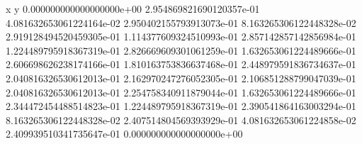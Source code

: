 x y
0.000000000000000000e+00 2.954869821690120357e-01
4.081632653061224164e-02 2.950402155793913073e-01
8.163265306122448328e-02 2.919128494520459305e-01
1.114377609324510993e-01 2.857142857142856984e-01
1.224489795918367319e-01 2.826669609301061259e-01
1.632653061224489666e-01 2.606698626238174166e-01
1.810163753836637468e-01 2.448979591836734637e-01
2.040816326530612013e-01 2.162970247276052305e-01
2.106851288799047039e-01 2.040816326530612013e-01
2.254758340911879044e-01 1.632653061224489666e-01
2.344472454488514823e-01 1.224489795918367319e-01
2.390541864163003294e-01 8.163265306122448328e-02
2.407514804569393929e-01 4.081632653061224858e-02
2.409939510341735647e-01 0.000000000000000000e+00
